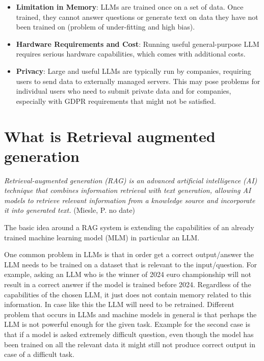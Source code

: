 \documentclass{wseas}
\begin{document}
\begin{itemize}

\item
  \textbf{Limitation in Memory}: LLMs are trained once on a set of data.
  Once trained, they cannot answer questions or generate text on data
  they have not been trained on (problem of under-fitting and high
  bias).
\item
  \textbf{Hardware Requirements and Cost}: Running useful
  general-purpose LLM requires serious hardware capabilities, which
  comes with additional costs.
\item
  \textbf{Privacy}: Large and useful LLMs are typically run by
  companies, requiring users to send data to externally managed servers.
  This may pose problems for individual users who need to submit private
  data and for companies, especially with GDPR requirements that might
  not be satisfied.
\end{itemize}


\section{What is Retrieval augmented generation}

\emph{Retrieval-augmented generation (RAG) is an advanced artificial intelligence (AI) technique that combines information retrieval with text generation, allowing AI models to retrieve relevant information from a knowledge source and incorporate it into generated text.} (Miesle, P. no date) \cite{cite6}


The basic idea around a RAG system is extending the capabilities of an
already trained machine learning model (MLM) in particular an LLM.

One common problem in LLMs is that in order get a correct output/answer
the LLM needs to be trained on a dataset that is relevant to the
input/question. For example, asking an LLM who is the winner of 2024
euro championship will not result in a correct answer if the model is
trained before 2024. Regardless of the capabilities of the chosen LLM,
it just does not contain memory related to this information. In case
like this the LLM will need to be retrained. Different problem that
occurs in LLMs and machine models in general is that perhaps the LLM is
not powerful enough for the given task. Example for the second case is
that if a model is asked extremely difficult question, even though the
model has been trained on all the relevant data it might still not
produce correct output in case of a difficult task.
\end{document}

